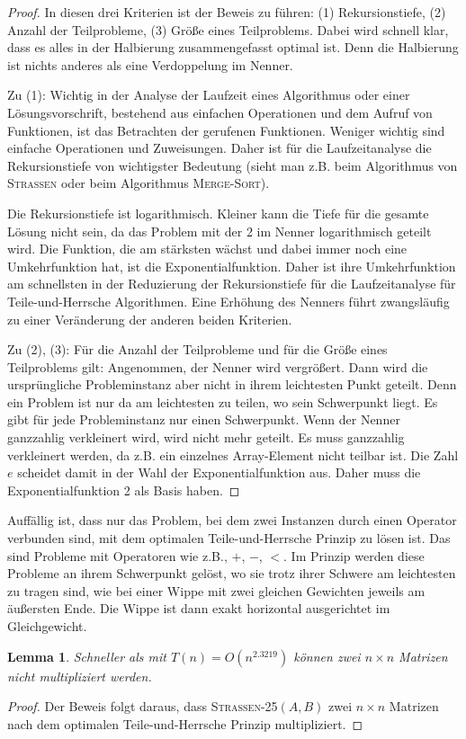 \documentclass{scrartcl}
\newtheorem{lemma}{Lemma}[section]
\begin{document}
\begin{proof}
	In diesen drei Kriterien ist der Beweis zu führen: (1) Rekursionstiefe, (2) Anzahl der Teilprobleme, (3) Größe eines Teilproblems. Dabei wird schnell klar, dass es alles in der Halbierung zusammengefasst optimal ist. Denn die Halbierung ist nichts anderes als eine Verdoppelung im Nenner.
	
	Zu (1): Wichtig in der Analyse der Laufzeit eines Algorithmus oder einer Lösungsvorschrift, bestehend aus einfachen Operationen und dem Aufruf von Funktionen, ist das Betrachten der gerufenen Funktionen. Weniger wichtig sind einfache Operationen und Zuweisungen. Daher ist für die Laufzeitanalyse die Rekursionstiefe von wichtigster Bedeutung (sieht man z.B. beim Algorithmus von \textsc{Strassen} oder beim Algorithmus \textsc{Merge-Sort}).
	
	Die Rekursionstiefe ist logarithmisch. Kleiner kann die Tiefe für die gesamte Lösung nicht sein, da das Problem mit der 2 im Nenner logarithmisch geteilt wird. Die Funktion, die am stärksten wächst und dabei immer noch eine Umkehrfunktion hat, ist die Exponentialfunktion. Daher ist ihre Umkehrfunktion am schnellsten in der Reduzierung der Rekursionstiefe für die Laufzeitanalyse für Teile-und-Herrsche Algorithmen. Eine Erhöhung des Nenners führt zwangsläufig zu einer Veränderung der anderen beiden Kriterien.
	
	Zu (2), (3): Für die Anzahl der Teilprobleme und für die Größe eines Teilproblems gilt: Angenommen, der Nenner wird vergrößert. Dann wird die ursprüngliche Probleminstanz aber nicht in ihrem leichtesten Punkt geteilt. Denn ein Problem ist nur da am leichtesten zu teilen, wo sein Schwerpunkt liegt. Es gibt für jede Probleminstanz nur einen Schwerpunkt. Wenn der Nenner ganzzahlig verkleinert wird, wird nicht mehr geteilt. Es muss ganzzahlig verkleinert werden, da z.B. ein einzelnes Array-Element nicht teilbar ist. Die Zahl $e$ scheidet damit in der Wahl der Exponentialfunktion aus. Daher muss die Exponentialfunktion 2 als Basis haben.
\end{proof}
Auffällig ist, dass nur das Problem, bei dem zwei Instanzen durch einen Operator verbunden sind, mit dem optimalen Teile-und-Herrsche Prinzip zu lösen ist. Das sind Probleme mit Operatoren wie z.B., $+$, $-$, $<$. Im Prinzip werden diese Probleme an ihrem Schwerpunkt gelöst, wo sie trotz ihrer Schwere am leichtesten zu tragen sind, wie bei einer Wippe mit zwei gleichen Gewichten jeweils am äußersten Ende. Die Wippe ist dann exakt horizontal ausgerichtet im Gleichgewicht.
\begin{lemma}
	Schneller als mit $T(n) = O(n^{2.3219})$ können zwei $n \times n$ Matrizen nicht multipliziert werden.
\end{lemma}
\begin{proof}
Der Beweis folgt daraus, dass \textsc{Strassen-25}$(A, B)$ zwei $n \times n$ Matrizen nach dem optimalen Teile-und-Herrsche Prinzip multipliziert.
\end{proof}
\end{document}
